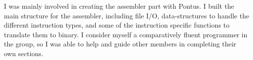 I was mainly involved in creating the assembler part with Pontus. I built the main structure for the assembler, including file I/O, data-structures to handle the different instruction types, and some of the instruction specific functions to translate them to binary. I consider myself a comparatively fluent programmer in the group, so I was able to help and guide other members in completing their own sections. 